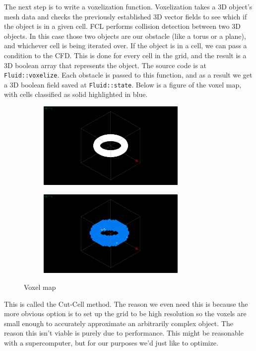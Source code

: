 \documentclass[a4paper,12pt]{article}
\begin{document}
The next step is to write a voxelization function. Voxelization takes a 3D
object's mesh data and checks the previously established 3D vector fields to see which
if the object is in a given cell. FCL performs collision detection between two 3D objects.
In this case those two objects are our obstacle (like a torus or a plane), and
whichever cell is being iterated over. If the object is in a cell, we can pass a
condition to the CFD. This is done for every cell in the grid, and the result
is a 3D boolean array that represents the object. The source code is at \lstinline{Fluid::voxelize}.
Each obstacle is passed to this function, and as a result we get a 3D boolean
field saved at \lstinline{Fluid::state}. Below is a figure of the voxel map,
with cells classified as solid highlighted in blue.

\begin{figure}[H]
    \centering
    \begin{subfigure}[t]{0.45\textwidth}
        \centering
        \includegraphics[height=1.65in]{resources/voxelize1.png}%
    \end{subfigure}
    \hfill
    \begin{subfigure}[t]{0.45\textwidth}
        \centering
        \includegraphics[height=1.65in]{resources/voxelize2.png}%
    \end{subfigure}
    \caption{Voxel map}
\end{figure}

This is called the Cut-Cell method. The reason we even need this is because
the more obvious option is to set up the grid to be high resolution so the voxels
are small enough to accurately approximate an arbitrarily complex object.
The reason this isn't viable is purely due to performance. This might be reasonable
with a supercomputer, but for our purposes we'd just like to optimize.
\end{document}

